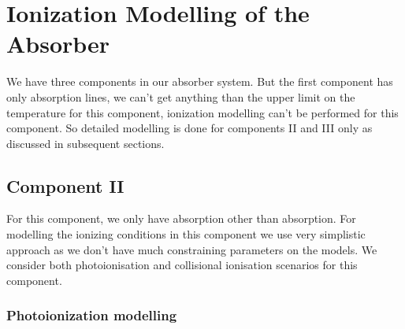         



\section{Ionization Modelling of the Absorber} \label{sec:ionization_modelling}
 
We have three components in our absorber system. But the first component has only  absorption lines, we can't get anything than the upper limit on the temperature for this component, ionization modelling can't be performed for this component. So detailed modelling is done for components II and III only as discussed in subsequent sections.

\subsection{Component II} \label{sec:compII_modelling}

For this component, we only have  absorption other than  absorption. For modelling the ionizing conditions in this component we use very simplistic approach as we don't have much constraining parameters on the models. We consider both photoionisation and collisional ionisation scenarios for this component.

\subsubsection{Photoionization modelling}

